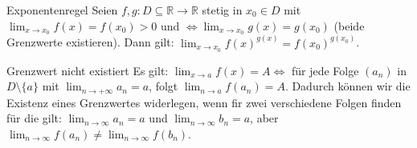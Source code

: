\documentclass[a4paper]{article}
\begin{document}
\begin{mainbox}{Exponentenregel}
  Seien $f,g: D \subseteq \mathbb{R} \rightarrow \mathbb{R}$ stetig in $x_0 \in D$ mit $\lim_{x \rightarrow x_0} f(x) = f(x_0) > 0$ und $\Leftrightarrow \lim_{x \rightarrow x_0} g(x) = g(x_0)$ (beide Grenzwerte existieren). Dann gilt: $\lim_{x \rightarrow x_0} f(x)^{g(x)} = f(x_0)^{g(x_0)}$.
\end{mainbox}

\begin{howtobox}{Grenzwert nicht existiert}
  Es gilt: $\lim_{x \rightarrow a} f(x) = A \Leftrightarrow$ für jede Folge $(a_n)$ in $D \setminus \{a\}$ mit $\lim_{n \rightarrow +\infty} a_n = a$, folgt $\lim_{n \rightarrow a} f(a_n) = A$. Dadurch können wir die Existenz eines Grenzwertes widerlegen, wenn fir zwei verschiedene Folgen finden für die gilt: $\lim_{n \rightarrow \infty} a_n = a$ und $\lim_{n \rightarrow \infty} b_n = a$, aber $\lim_{n \rightarrow \infty} f(a_n) \neq \lim_{n \rightarrow \infty} f(b_n)$.
\end{howtobox}
\end{document}
